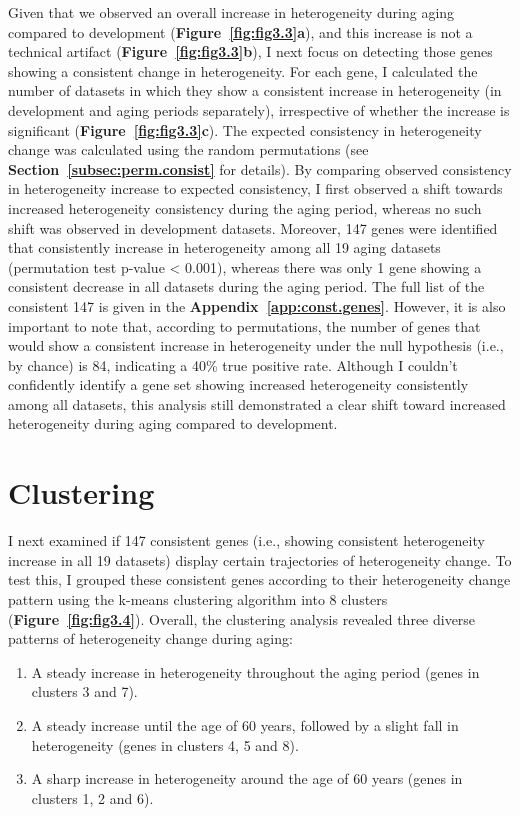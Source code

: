 Given that we observed an overall increase in heterogeneity during aging compared to development (\textbf{Figure~\ref{fig:fig3.3}a}),
and this increase is not a technical artifact (\textbf{Figure~\ref{fig:fig3.3}b}), I next focus on detecting those genes showing a consistent change in heterogeneity. 
For each gene, I calculated the number of datasets in which they show a  consistent increase in heterogeneity (in development and aging periods separately), 
irrespective of whether the increase is significant (\textbf{Figure~\ref{fig:fig3.3}c}).
The expected consistency in heterogeneity change was calculated using the random permutations (see \textbf{Section~\ref{subsec:perm.consist}} for details).
By comparing observed consistency in heterogeneity increase to expected consistency, I first observed a shift towards increased heterogeneity consistency
during the aging period, whereas no such shift was observed in development datasets.
Moreover, 147 genes were identified that consistently increase in heterogeneity among all 19 aging datasets (permutation test p-value < 0.001), 
whereas there was only 1 gene showing a consistent decrease in all datasets during the aging period.
The full list of the consistent 147 is given in the \textbf{Appendix~\ref{app:const.genes}}.
However, it is also important to note that, according to permutations, 
the number of genes that would show a consistent increase in heterogeneity under the null hypothesis (i.e., by chance) is 84,
indicating a 40\% true positive rate.
Although I couldn't confidently identify a gene set showing increased heterogeneity consistently among all datasets,
this analysis still demonstrated a clear shift toward increased heterogeneity during aging compared to development. 

\section{Clustering}
I next examined if 147 consistent genes (i.e., showing consistent heterogeneity increase in all 19 datasets) display certain trajectories of heterogeneity change.
To test this, I grouped these consistent genes according to their heterogeneity change pattern using the k-means clustering algorithm into 8 clusters (\textbf{Figure~\ref{fig:fig3.4}}).
Overall, the clustering analysis revealed three diverse patterns of heterogeneity change during aging:

\begin{enumerate}
    \item A steady increase in heterogeneity throughout the aging period (genes in clusters 3 and 7).
    \item A steady increase until the age of 60 years, followed by a slight fall in heterogeneity (genes in clusters 4, 5 and 8).
    \item A sharp increase in heterogeneity around the age of 60 years (genes in clusters 1, 2 and 6).
\end{enumerate}



